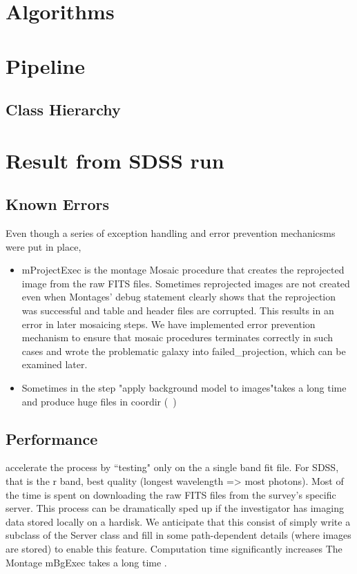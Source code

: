 \documentclass[5p]{elsarticle}
\begin{document}
\section{Algorithms}
\section{Pipeline}
	\subsection{Class Hierarchy}
\section{Result from SDSS run}
	\subsection{Known Errors}
		
	Even though a series of exception handling and error prevention mechanicsms were put in place, 
	 	\begin{itemize}
	 		\item mProjectExec is the montage Mosaic procedure that creates the reprojected image from the raw FITS files. Sometimes reprojected images are not created even when Montages' debug statement clearly shows that the reprojection was successful and table and header files are corrupted. This results in an error in later mosaicing steps. We have implemented error prevention mechanism to ensure that mosaic procedures terminates correctly in such cases and wrote the problematic galaxy into failed\_projection, which can be examined later.
	 		\item Sometimes in the step "apply background model to images"takes a long time and produce huge files in coordir (~)
	 	\end{itemize}
	
	\subsection{Performance}
	accelerate the process by ``testing" only on the a single band fit file. For SDSS, that is the r band, best quality (longest wavelength => most photons).  Most of the time is spent on downloading the raw FITS files from the survey's specific server. This process can be dramatically sped up if the investigator has imaging data stored locally on a hardisk. We anticipate that this consist of 	 simply write a subclass of the Server class and fill in some path-dependent details (where images are stored) to enable this feature.
	Computation time significantly increases 
The Montage 	mBgExec takes a long time . 
\end{document}
